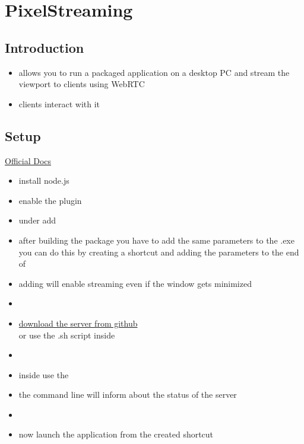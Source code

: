 \chapter{PixelStreaming}
\label{PixelStreaming}
    \section{Introduction}
        \begin{itemize}
            \item allows you to run a packaged application on a desktop PC and stream the viewport to clients using WebRTC
            \item clients interact with it
        \end{itemize}

    \section{Setup}
        \href{https://docs.unrealengine.com/en-US/Platforms/PixelStreaming/GettingStarted/index.html}{Official Docs}
        \begin{itemize}
            \item install node.js
            \item enable the plugin 
            \item under  add  \\
            \item after building the package you have to add the same parameters to the .exe \\
            you can do this by creating a shortcut and adding the parameters to the end of 
            \item adding  will enable streaming even if the window gets minimized
            \item 
            \item \href{https://github.com/EpicGamesExt/PixelStreamingInfrastructure.git}{download the server from github} \\
            or use the .sh script inside \code{\\Engine\\Plugins\\Media\\PixelStreaming\\Resources\\WebServers}
            \item 
            \item inside  use the 
            \item the command line will inform about the status of the server
            \item 
            \item now launch the application from the created shortcut
        \end{itemize}

